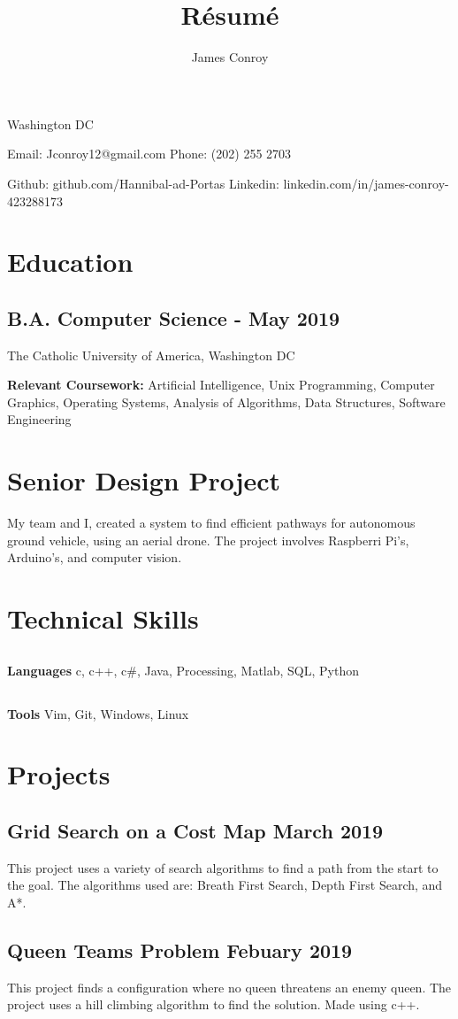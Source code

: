 \documentclass{article}
\author{James Conroy}
\title{R\'esum\'e}
\makeatletter
\renewcommand{\maketitle} {
	\begin{center}
	{\huge\bfseries
	\theauthor}

	Washington DC
	\end{center}


	Email: Jconroy12@gmail.com
	\hfill Phone: (202) 255 2703

	Github: github.com/Hannibal-ad-Portas
	\hfill Linkedin: linkedin.com/in/james-conroy-423288173
}
\makeatother
\begin{document}
\maketitle
\section{Education}
\subsection{B.A. Computer Science - May 2019}
The Catholic University of America, Washington DC

\textbf {Relevant Coursework:}
Artificial Intelligence,
Unix Programming,
Computer Graphics,
Operating Systems,
Analysis of Algorithms,
Data Structures,
Software Engineering
\section{Senior Design Project}
My team and I, created a system to find efficient pathways for autonomous ground vehicle, using an aerial drone.
The project involves Raspberri Pi's, Arduino's, and computer vision.
\section{Technical Skills}

\subsection{}
\textbf{Languages}
c,
c++,
c\#,
Java,
Processing,
Matlab,
SQL,
Python

\subsection{}
\textbf{Tools}
Vim,
Git,
Windows,
Linux

\section{Projects}

\subsection{Grid Search on a Cost Map \hfill March 2019}
This project uses a variety of search algorithms to find a path from the start to the goal.
The algorithms used are:
Breath First Search,
Depth First Search,
and
A*.
\subsection{Queen Teams Problem \hfill Febuary 2019}
This project finds a configuration where no queen threatens an enemy queen.
The project uses a hill climbing algorithm to find the solution.
Made using c++.
\end{document}
